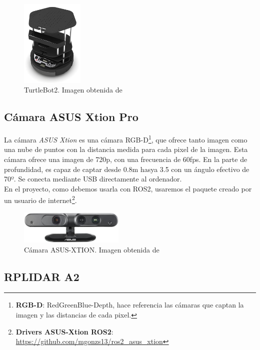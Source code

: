 \begin{figure} [H]
    \begin{center}
        \includegraphics[width=3cm]{figs/c3/turtlebot2_body.jpg}
    \end{center}
    \caption[TurtleBot2]{TurtleBot2. Imagen obtenida de \cite{turtlebot_2_structure}}
    \label{fig:turtlebot_2_structure}
\end{figure}

\subsection{Cámara ASUS Xtion Pro}
\label{subsec:asus_xtion}
La cámara \textit{ASUS Xtion} es una cámara RGB-D\footnote{\textbf{RGB-D}: RedGreenBlue-Depth, hace referencia las cámaras que captan la imagen y
las distancias de cada pixel.}, que ofrece tanto imagen como una nube de puntos con la distancia medida para cada pixel de la imagen.
Esta cámara ofrece una imagen de 720p, con una frecuencia de 60fps. En la parte de profundidad, es capaz de captar desde 0.8m hasya 3.5 con un
ángulo efectivo de 70º. Se conecta mediante USB directamente al ordenador.\\
En el proyecto, como debemos usarla con ROS2, usaremos el paquete creado por un usuario de
internet\footnote{\textbf{Drivers ASUS-Xtion ROS2}: \url{https://github.com/mgonzs13/ros2_asus_xtion}}.\\
\begin{figure} [H]
    \begin{center}
        \includegraphics[width=5cm]{figs/c3/asus_xtion.jpg}
    \end{center}
    \caption[Cámara ASUS-XTION]{Cámara ASUS-XTION. Imagen obtenida de \cite{asus_xtion}}
    \label{fig:asus_xtion}
\end{figure}

\subsection{RPLIDAR A2}
\label{subsec:rplidar_a2}


